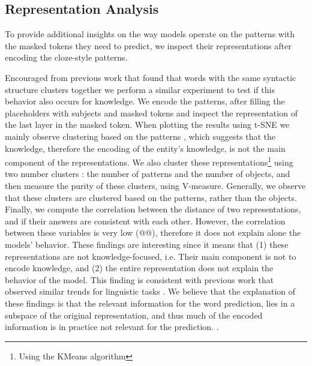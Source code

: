 \subsection{Representation Analysis}


To provide additional insights on the way models operate on the patterns with the masked tokens they need to predict, we inspect their representations after encoding the cloze-style patterns.

Encouraged from previous work that found that words with the same syntactic structure clusters together \cite{chi-etal-2020-finding,ravfogel-etal-2020-unsupervised} we perform a similar experiment to test if this behavior also occurs for knowledge.
We encode the patterns, after filling the placeholders with subjects and masked tokens and inspect the representation of the last layer in the masked token.
When plotting the results using t-SNE \cite{tsne} we mainly observe clustering based on the patterns  , which suggests that the knowledge, therefore the encoding of the entity's knowledge, is not the main component of the representations.
We also cluster these representations\footnote {Using the KMeans algorithm} using two number clusters : the number of patterns and the number of objects, and then measure the purity of these clusters, using V-measure. Generally, we observe that these clusters are clustered based on the patterns, rather than the objects.
Finally, we compute the correlation between the distance of two representations, and if their answers are consistent with each other. However, the correlation between these variables is very low (@@), therefore it does not explain alone the models' behavior.
These findings are interesting since it means that (1) these representations are not knowledge-focused, i.e. Their main component is not to encode knowledge, and (2) the entire representation does not explain the behavior of the model. This finding is consistent with previous work that observed similar trends for linguistic tasks \cite{amnesic_probing}.
We believe that the explanation of these findings is that the relevant information for the word prediction, lies in a subspace of the original representation, and thus much of the encoded information is in practice not relevant for the prediction. .


